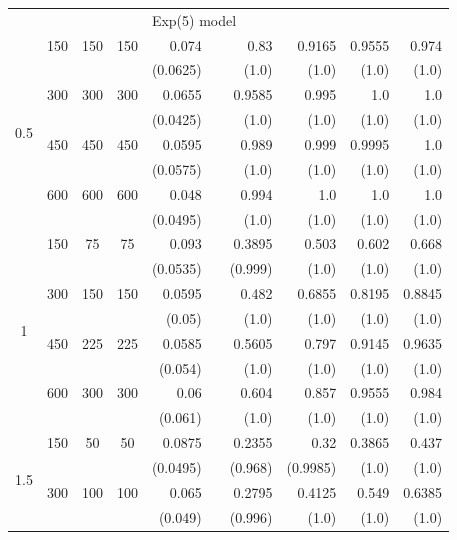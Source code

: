 \begin{table}[htbp]
\begin{tabular}{ccccrrrrrr}
        &   &     &     & \multicolumn{6}{l}{Exp(5) model} \\
        \multirow{8}{*}{0.5}
            & 150 & 150 & 150 & 0.074 &       & 0.83 & 0.9165 & 0.9555 & 0.974 \\
            &     &     &     & (0.0625) &       & (1.0) & (1.0) & (1.0) & (1.0) \\
            & 300 & 300 & 300 & 0.0655 &       & 0.9585 & 0.995 & 1.0 & 1.0 \\
            &     &     &     & (0.0425) &       & (1.0) & (1.0) & (1.0) & (1.0) \\
            & 450 & 450 & 450 & 0.0595 &       & 0.989 & 0.999 & 0.9995 & 1.0 \\
            &     &     &     & (0.0575) &       & (1.0) & (1.0) & (1.0) & (1.0) \\
            & 600 & 600 & 600 & 0.048 &       & 0.994 & 1.0 & 1.0 & 1.0 \\
            &     &     &     & (0.0495) &       & (1.0) & (1.0) & (1.0) & (1.0) \\
            \midrule
        \multirow{8}{*}{1}
            & 150 & 75 & 75 & 0.093 &       & 0.3895 & 0.503 & 0.602 & 0.668 \\
            &     &     &     & (0.0535) &       & (0.999) & (1.0) & (1.0) & (1.0) \\
            & 300 & 150 & 150 & 0.0595 &       & 0.482 & 0.6855 & 0.8195 & 0.8845 \\
            &     &     &     & (0.05) &       & (1.0) & (1.0) & (1.0) & (1.0) \\
            & 450 & 225 & 225 & 0.0585 &       & 0.5605 & 0.797 & 0.9145 & 0.9635 \\
            &     &     &     & (0.054) &       & (1.0) & (1.0) & (1.0) & (1.0) \\
            & 600 & 300 & 300 & 0.06 &       & 0.604 & 0.857 & 0.9555 & 0.984 \\
            &     &     &     & (0.061) &       & (1.0) & (1.0) & (1.0) & (1.0) \\
            \midrule
        \multirow{8}{*}{1.5}
            & 150 & 50 & 50 & 0.0875 &       & 0.2355 & 0.32 & 0.3865 & 0.437 \\
            &     &     &     & (0.0495) &       & (0.968) & (0.9985) & (1.0) & (1.0) \\
            & 300 & 100 & 100 & 0.065 &       & 0.2795 & 0.4125 & 0.549 & 0.6385 \\
            &     &     &     & (0.049) &       & (0.996) & (1.0) & (1.0) & (1.0) \\

\end{tabular}
\end{table}
